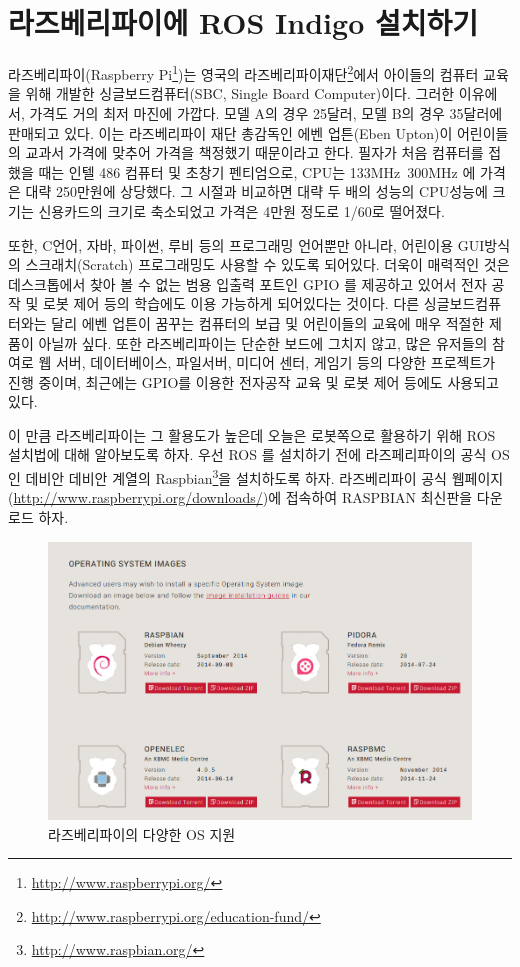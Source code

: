 \section{라즈베리파이에 ROS Indigo 설치하기}

라즈베리파이(Raspberry Pi\footnote{\url{http://www.raspberrypi.org/}})는 영국의 라즈베리파이재단\footnote{\url{http://www.raspberrypi.org/education-fund/}}에서 아이들의 컴퓨터 교육을 위해 개발한 싱글보드컴퓨터(SBC, Single Board Computer)이다. 그러한 이유에서, 가격도 거의 최저 마진에 가깝다. 모델 A의 경우 25달러, 모델 B의 경우 35달러에 판매되고 있다. 이는 라즈베리파이 재단 총감독인 에벤 업튼(Eben Upton)이 어린이들의 교과서 가격에 맞추어 가격을 책정했기 때문이라고 한다. 필자가 처음 컴퓨터를 접했을 때는 인텔 486 컴퓨터 및 초창기 펜티엄으로, CPU는 133MHz~300MHz 에 가격은 대략 250만원에 상당했다. 그 시절과 비교하면 대략 두 배의 성능의 CPU성능에 크기는 신용카드의 크기로 축소되었고 가격은 4만원 정도로 1/60로 떨어졌다. 

또한, C언어, 자바, 파이썬, 루비 등의 프로그래밍 언어뿐만 아니라, 어린이용 GUI방식의 스크래치(Scratch) 프로그래밍도 사용할 수 있도록 되어있다. 더욱이 매력적인 것은 데스크톱에서 찾아 볼 수 없는 범용 입출력 포트인 GPIO 를 제공하고 있어서 전자 공작 및 로봇 제어 등의 학습에도 이용 가능하게 되어있다는 것이다. 다른 싱글보드컴퓨터와는 달리 에벤 업튼이 꿈꾸는 컴퓨터의 보급 및 어린이들의 교육에 매우 적절한 제품이 아닐까 싶다. 또한 라즈베리파이는 단순한 보드에 그치지 않고, 많은 유저들의 참여로 웹 서버, 데이터베이스, 파일서버, 미디어 센터, 게임기 등의 다양한 프로젝트가 진행 중이며, 최근에는 GPIO를 이용한 전자공작 교육 및 로봇 제어 등에도 사용되고 있다\cite{lp2013raspberry}.

이 만큼 라즈베리파이는 그 활용도가 높은데 오늘은 로봇쪽으로 활용하기 위해 ROS 설치법에 대해 알아보도록 하자. 우선 ROS 를 설치하기 전에 라즈페리파이의 공식 OS인 데비안 데비안 계열의 Raspbian\footnote{\url{http://www.raspbian.org/}}을 설치하도록 하자. 라즈베리파이 공식 웹페이지(\url{http://www.raspberrypi.org/downloads/})에 접속하여 RASPBIAN 최신판을 다운로드 하자.

\begin{figure}[h]
\centering\includegraphics[width=\columnwidth]{pictures/chapter3/raspberrypi_raspbian_download.png}
\caption{라즈베리파이의 다양한 OS 지원}
\end{figure}

